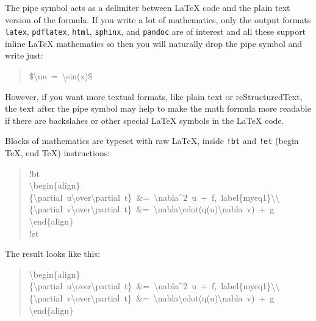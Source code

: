 \documentclass[a4paper]{article}
\begin{document}
The pipe symbol acts as a delimiter between LaTeX code and the plain text
version of the formula. If you write a lot of mathematics, only the
output formats \texttt{latex}, \texttt{pdflatex}, \texttt{html}, \texttt{sphinx}, and \texttt{pandoc}
are of interest
and all these support inline LaTeX mathematics so then you will naturally
drop the pipe symbol and write just:
%
\begin{quote}{\ttfamily \raggedright \noindent
\$\textbackslash{}nu~=~\textbackslash{}sin(x)\$
}
\end{quote}

However, if you want more textual formats, like plain text or reStructuredText,
the text after the pipe symbol may help to make the math formula more readable
if there are backslahes or other special LaTeX symbols in the LaTeX code.

Blocks of mathematics are typeset with raw LaTeX, inside
\texttt{!bt} and \texttt{!et} (begin TeX, end TeX) instructions:
%
\begin{quote}{\ttfamily \raggedright \noindent
!bt\\
\textbackslash{}begin\{align\}\\
\{\textbackslash{}partial~u\textbackslash{}over\textbackslash{}partial~t\}~\&=~\textbackslash{}nabla\textasciicircum{}2~u~+~f,~label\{myeq1\}\textbackslash{}\textbackslash{}\\
\{\textbackslash{}partial~v\textbackslash{}over\textbackslash{}partial~t\}~\&=~\textbackslash{}nabla\textbackslash{}cdot(q(u)\textbackslash{}nabla~v)~+~g\\
\textbackslash{}end\{align\}\\
!et
}
\end{quote}




The result looks like this:
%
\begin{quote}{\ttfamily \raggedright \noindent
\textbackslash{}begin\{align\}\\
\{\textbackslash{}partial~u\textbackslash{}over\textbackslash{}partial~t\}~\&=~\textbackslash{}nabla\textasciicircum{}2~u~+~f,~label\{myeq1\}\textbackslash{}\textbackslash{}\\
\{\textbackslash{}partial~v\textbackslash{}over\textbackslash{}partial~t\}~\&=~\textbackslash{}nabla\textbackslash{}cdot(q(u)\textbackslash{}nabla~v)~+~g\\
\textbackslash{}end\{align\}
}
\end{quote}
\end{document}

